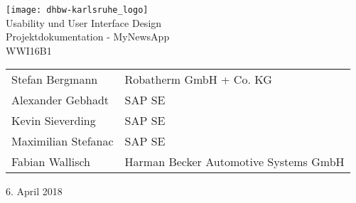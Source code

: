 
\begin{titlepage}
   \pagestyle{empty}
   \centering
   \texttt{[image: dhbw-karlsruhe\_logo]}\qquad
   \mbox{}\vspace{4\baselineskip}\\
   \rmfamily\Large
   \centering
   Usability und User Interface Design
   \vspace{1\baselineskip}\\
   \sffamily\huge
   \centering
   Projektdokumentation - MyNewsApp
   \vspace{1\baselineskip}\\
   \rmfamily
   \large
   WWI16B1
   \normalsize
   \vspace{3\baselineskip}\\

   \begin{tabular}{l l}

     Stefan Bergmann & Robatherm GmbH + Co. KG \\
     Alexander Gebhadt & SAP SE \\
     Kevin Sieverding & SAP SE \\
     Maximilian Stefanac & SAP SE \\
     Fabian Wallisch & Harman Becker Automotive Systems GmbH \\

   \end{tabular}

   \vspace{3\baselineskip}

   \large

   6. April 2018


\end{titlepage}
